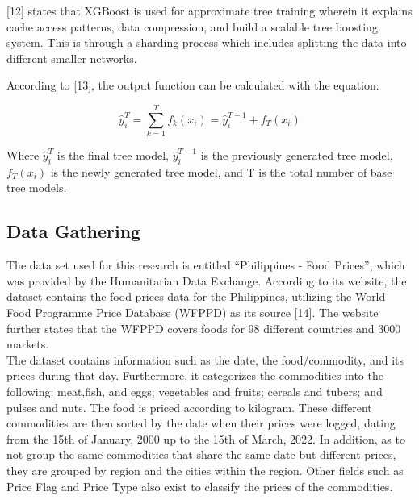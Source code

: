 \documentclass[runningheads]{llncs}
\begin{document}
[12] states that XGBoost is used for approximate tree training wherein it explains cache access patterns, data compression, and build a scalable tree boosting system. This is through a sharding process which includes splitting the data  into different smaller networks. 

According to [13], the output function can be calculated with the equation:

\begin{equation}
	\hat{y}_i^T = \sum_{k=1}^{T} f_k (x_i) = \hat{y}_i^{T-1} +  f_T (x_i)
\end{equation}

 Where $\hat{y}_i^T$ is the final tree model, $ \hat{y}_i^{T-1}$ is the previously generated tree model, $f_T (x_i)$ is the newly generated tree model, and T is the total number of base tree models.

\subsection{Data Gathering}
	The data set used for this research is entitled “Philippines - Food Prices”, which was provided by the Humanitarian Data Exchange. According to its website, the dataset contains the food prices data for the Philippines, utilizing the World Food Programme Price Database (WFPPD) as its source [14]. The website further states that the WFPPD covers foods for 98 different countries and 3000 markets. \\

The dataset contains information such as the date, the food/commodity, and its prices during that day. Furthermore, it categorizes the commodities into the following: meat,fish, and eggs; vegetables and fruits; cereals and tubers; and pulses and nuts. The food is priced according to kilogram. These different commodities are then sorted by the date when their prices were logged,  dating from the 15th of January, 2000 up to the 15th of March, 2022. In addition, as to not group the same commodities that share the same date but different prices, they are grouped by region and the cities within the region. Other fields such as Price Flag and Price Type also exist to classify the prices of the commodities.\\
\end{document}
